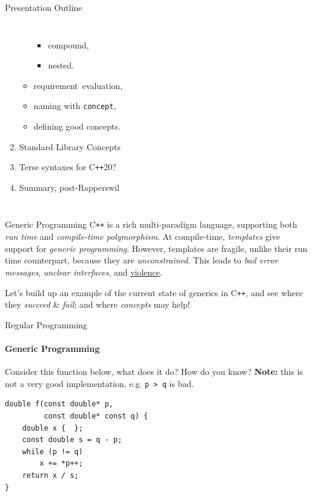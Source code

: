 \documentclass{beamer}
\begin{document}
\begin{frame}[fragile]{Presentation Outline}
\begin{columns}
\begin{enumerate}
\begin{itemize}
\begin{itemize}
                        \item compound,
                        \item nested.
                    \end{itemize}
                    \item requirement\, evaluation,
                    \item naming with \texttt{concept},
                    \item defining good concepts.
                \end{itemize}
                \item Standard Library Concepts
                \item Terse syntaxes for C\texttt{++}20?
                \item Summary, post-Rapperswil
            \end{enumerate}
        \end{columns}
    \end{frame}

    \begin{frame}[fragile]{Generic Programming}
        C\texttt{++} is a rich multi-paradigm language, supporting both \emph{run time} and \emph{compile-time polymorphism}. At compile-time, \emph{templates} give support for \emph{generic programming}. However, templates are fragile, unlike their run time counterpart, because they are \emph{unconstrained}. This leads to \emph{bad error messages}, \emph{unclear interfaces}, and \underline{violence}.

        \vspace{1em}
        Let's build up an example of the current state of generics in C\texttt{++}, and see where they \emph{succeed} \& \emph{fail}; and where \emph{concepts} may help!
    \end{frame}

    \begin{frame}[fragile]{Regular Programming}
        \framesubtitle{Generic Programming}
        Consider this function below, what does it do? How do you know? \textbf{Note:} this is not a very good implementation, e.g. \texttt{p > q} is bad.
        \begin{center}
        \begin{lstlisting}[caption={a ``mysterious'' function; can you figure out what this code is?}]
double f(const double* p,
         const double* const q) {
    double x {  };
    const double s = q - p;
    while (p != q)
        x += *p++;
    return x / s;
} \end{lstlisting}
        \end{center}
    \end{frame}
\end{document}
